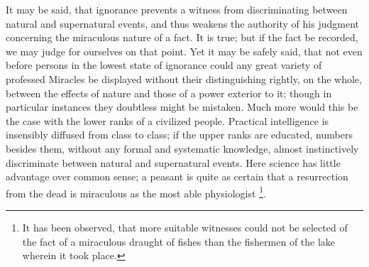 It may be said, that ignorance prevents a witness
from discriminating between natural and supernatural events, and thus
weakens the authority of his judgment concerning the miraculous nature
of a fact. It is true; but if the fact be recorded, we may judge for
ourselves on that point. Yet it may be safely said, that not even
before persons in the lowest state of ignorance could any great
variety of professed Miracles be displayed without their
distinguishing rightly, on the whole, between the effects of nature
and those of a power exterior to it; though in particular instances
they doubtless might be mistaken. Much more would this be the case
with the lower ranks of a civilized people. Practical intelligence is
insensibly diffused from class to class; if the upper ranks are
educated, numbers besides them, without any formal and systematic
knowledge, almost instinctively discriminate between natural and
supernatural events. Here science has little advantage over common
sense; a peasant is quite as certain that a resurrection from the dead
is miraculous as the most able physiologist \footnote{It has been observed, that more suitable witnesses could not be
selected of the fact of a miraculous draught of fishes than the
fishermen of the lake wherein it took place.}.

